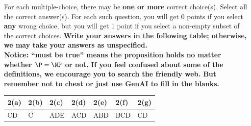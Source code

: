 For each multiple-choice, there may be \textbf{one or more} correct choice(s). Select all the correct answer(s). For each such question, you will get 0 points if you select \textbf{any} wrong choice, but you will get 1 point if you select a non-empty subset of the correct choices.
\textbf{Write your answers in the following table; otherwise, we may take your answers as unspecified.}\\
\textbf{Notice: ``must be true'' means the proposition holds no matter whether $\P = \NP$ or not. If you feel confused about some of the definitions, we encourage you to search the friendly web. But remember not to cheat or just use GenAI to fill in the blanks.}


\begin{table}[htbp]
    \centering
    \begin{tabular}{|p{1.5cm}|p{1.5cm}|p{1.5cm}|p{1.5cm}|p{1.5cm}|p{1.5cm}|p{1.5cm}|}
        \hline
        2(a) & 2(b) & 2(c) & 2(d) & 2(e) & 2(f) & 2(g) \\
        \hline
         CD &  C & ADE  &  ACD & ABD  & BCD  & CD \\
        \hline
    \end{tabular}
\end{table}

